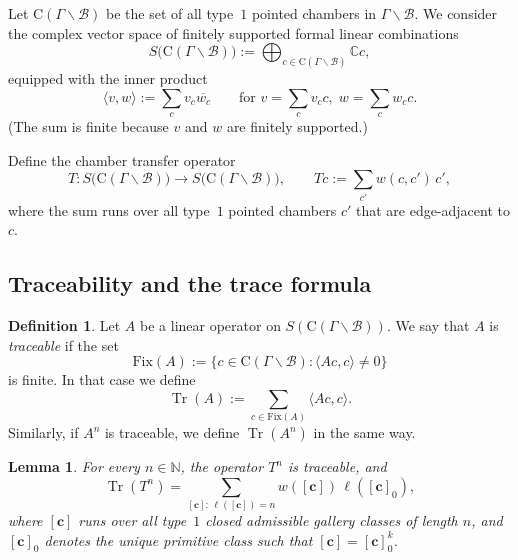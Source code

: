 \documentclass[11pt]{amsart}
\newtheorem{lem}[thm]{Lemma}
\theoremstyle{definition}
\newtheorem{definition}[thm]{Definition}
\theoremstyle{remark}
\numberwithin{equation}{section}
\begin{document}
Let $\mathrm{C}(\Gamma\backslash\mathcal{B})$ be the set of all type~$1$ pointed chambers in $\Gamma\backslash\mathcal{B}$.
We consider the complex vector space of finitely supported formal linear combinations
\[
S\bigl(\mathrm{C}(\Gamma\backslash\mathcal{B})\bigr)
:=
\bigoplus_{c\in \mathrm{C}(\Gamma\backslash\mathcal{B})}\mathbb{C}c,
\]
equipped with the inner product
\[
\langle v,w\rangle := \sum_{c} v_c \overline{w_c}
\qquad
\text{for } v=\sum_c v_c c,\; w=\sum_c w_c c.
\]
(The sum is finite because $v$ and $w$ are finitely supported.)

Define the chamber transfer operator
\[
T: S\bigl(\mathrm{C}(\Gamma\backslash\mathcal{B})\bigr)\to
S\bigl(\mathrm{C}(\Gamma\backslash\mathcal{B})\bigr),
\qquad
Tc := \sum_{c'} w(c,c')\,c',
\]
where the sum runs over all type~$1$ pointed chambers $c'$ that are edge-adjacent to $c$.

\subsection{Traceability and the trace formula}

\begin{definition}\label{def:traceable}
Let $A$ be a linear operator on $S(\mathrm{C}(\Gamma\backslash\mathcal{B}))$.
We say that $A$ is \emph{traceable} if the set
\[
\mathrm{Fix}(A):=\{c\in \mathrm{C}(\Gamma\backslash\mathcal{B}) : \langle Ac,c\rangle \neq 0\}
\]
is finite. In that case we define
\[
\operatorname{Tr}(A) := \sum_{c\in \mathrm{Fix}(A)} \langle Ac,c\rangle.
\]
Similarly, if $A^n$ is traceable, we define $\operatorname{Tr}(A^n)$ in the same way.
\end{definition}

\begin{lem}\label{lem:4.1}
For every $n\in\mathbb{N}$, the operator $T^n$ is traceable, and
\[
\operatorname{Tr}(T^n)
=
\sum_{[\mathbf{c}]:\,\ell([\mathbf{c}])=n} w([\mathbf{c}])\,\ell([\mathbf{c}]_0),
\]
where $[\mathbf{c}]$ runs over all type~$1$ closed admissible gallery classes of length $n$,
and $[\mathbf{c}]_0$ denotes the unique primitive class such that $[\mathbf{c}]=[\mathbf{c}]_0^k$.
\end{lem}
\end{document}
